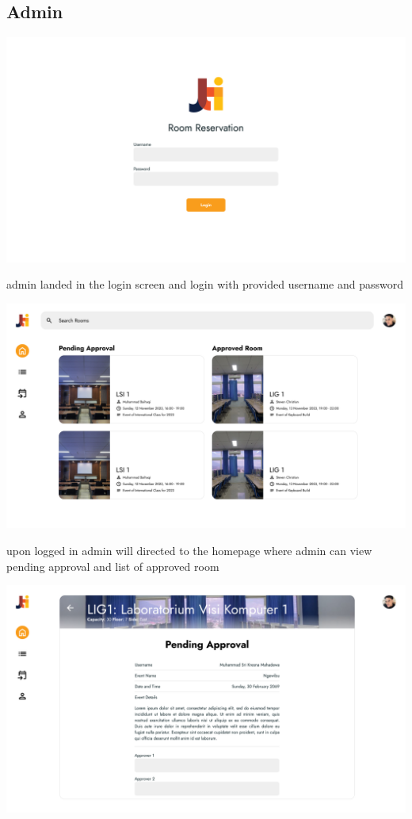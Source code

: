 \documentclass[12pt,titlepage,a4paper]{report}
\begin{document}
    \subsection{Admin}
    \begin{center}
        \includegraphics[width=\textwidth]{images/figures/UIUX/login.png}\\
    \end{center}
    admin landed in the login screen and login with provided username and password
    \begin{center}
        \includegraphics[width=\textwidth]{images/figures/UIUX/home 1.png}\\
    \end{center}
    upon logged in admin will directed to the homepage where admin can view pending approval and list of approved room
    \begin{center}
        \includegraphics[width=\textwidth]{images/figures/UIUX/approval.png}\\
    \end{center}
\end{document}
